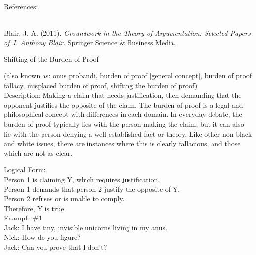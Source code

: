 \documentclass[a4paper,12pt,single,pdftex]{scrbook}
\begin{document}
    References:

    
      
        
      \\

      
        
          Blair, J. A. (2011). {\it Groundwork in the Theory of Argumentation: Selected Papers of J. Anthony Blair}. Springer Science \& Business Media.
        
      
    
  

Shifting of the Burden of Proof
    
      (also known as: onus probandi, burden of proof [general concept], burden of proof fallacy, misplaced burden of proof, shifting the burden of proof)
    \\

  
    Description: Making a claim that needs justification, then demanding that the opponent justifies the opposite of the claim. The burden of proof is a legal and philosophical concept with differences in each domain. In everyday debate, the burden of proof typically lies with the person making the claim, but it can also lie with the person denying a well-established fact or theory. Like other non-black and white issues, there are instances where this is clearly fallacious, and those which are not as clear.

    
      Logical Form:
    \\

    
      Person 1 is claiming Y, which requires justification.
    \\

    
      Person 1 demands that person 2 justify the opposite of Y.
    \\

    
      Person 2 refuses or is unable to comply.
    \\

    
      Therefore, Y is true.
    \\

    
      Example \#1:
    \\

    
      Jack: I have tiny, invisible unicorns living in my anus.
    \\

    
      Nick: How do you figure?
    \\

    
      Jack: Can you prove that I don't?
    \\
\end{document}
